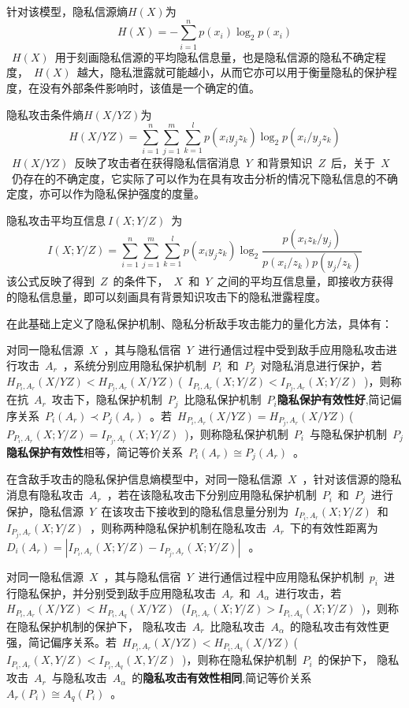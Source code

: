 \documentclass[pdftex,notypeinfo,twoside,openany,UTF8,fntef]{CASthesis}
\theoremstyle{THrm}{
	\newtheorem{question}{Question}[section]
	\newtheorem{property}{性质}[section]
	\newtheorem{assumption}{假设}[section]
	\newtheorem{claim}[lemma]{断言}
	
}
\begin{document}
针对该模型，隐私信源熵$H(X)$为
\begin{equation}
H(X)=-\sum_{i=1}^{n}p(x_{i})\log_{2}p(x_{i})
\end{equation}
~$H(X)$~用于刻画隐私信源的平均隐私信息量，也是隐私信源的隐私不确定程度，~$H(X)$~越大，隐私泄露就可能越小，从而它亦可以用于衡量隐私的保护程度，在没有外部条件影响时，该值是一个确定的值。

隐私攻击条件熵$H(X/YZ)$为
\begin{equation}
H(X/YZ)=\sum_{i=1}^{n}\sum_{j=1}^{m}\sum_{k=1}^{l}p(x_{i}y_{j}z_{k})\log_{2}p(x_{i}/y_{j}z_{k})
\end{equation}
~$H(X/YZ)$~反映了攻击者在获得隐私信宿消息~$Y$~和背景知识~$Z$~后，关于~$X$~仍存在的不确定度，它实际了可以作为在具有攻击分析的情况下隐私信息的不确定度，亦可以作为隐私保护强度的度量。

隐私攻击平均互信息$~I(X;Y/Z)$~为
\begin{equation}
I(X;Y/Z)=\sum_{i=1}^{n}\sum_{j=1}^{m}\sum_{k=1}^{l}p(x_{i}y_{j}z_{k})\log_{2}\frac{p(x_{i}z_{k}/y_{j})}{p(x_{i}/z_{k})p(y_{j}/z_{k})}
\end{equation}
该公式反映了得到~$Z$~的条件下，~$X$~和~$Y$~之间的平均互信息量，即接收方获得的隐私信息量，即可以刻画具有背景知识攻击下的隐私泄露程度。

在此基础上定义了隐私保护机制、隐私分析敌手攻击能力的量化方法，具体有：

对同一隐私信源~$X$~，其与隐私信宿~$Y$~进行通信过程中受到敌手应用隐私攻击进行攻击~$A_{r}$~，系统分别应用隐私保护机制~$P_{i}$~和~$P_{j}$~对隐私消息进行保护，若~$H_{P_{i},A_{r}}(X/YZ)<H_{P_{j},A_{r}}(X/YZ)~$(~$I_{P_{i},A_{r}}(X;Y/Z)<I_{P_{j},A_{r}}(X;Y/Z)$~)，则称在抗~$A_{r}$~攻击下，隐私保护机制~$P_{j}$~比隐私保护机制~$P_{i}$\textbf{隐私保护有效性好},简记偏序关系~$P_{i}(A_{r})\prec P_{j}(A_{r})$~。若~$H_{P_{i},A_{r}}(X/YZ)=H_{P_{j},A_{r}}(X/YZ)~$(~$P_{P_{i},A_{r}}(X;Y/Z)=I_{P_{j},A_{r}}(X;Y/Z)$~)，则称隐私保护机制~$P_{i}$~与隐私保护机制~$P_{j}$\textbf{隐私保护有效性}相等，简记等价关系~$P_{i}(A_{r})\cong P_{j}(A_{r})$~。


在含敌手攻击的隐私保护信息熵模型中，对同一隐私信源~$X$~，针对该信源的隐私消息有隐私攻击~$A_{r}$~，若在该隐私攻击下分别应用隐私保护机制~$P_{i}$~和~$P_{j}$~进行保护，隐私信源~$Y$~在该攻击下接收到的隐私信息量分别为~$I_{P_{i},A_{r}}(X;Y/Z)$~和~$I_{P_{j},A_{r}}(X;Y/Z)$~，则称两种隐私保护机制在隐私攻击~$A_{r}$~下的有效性距离为~$D_{i}(A_{r})=\left | I_{P_{i},A_{r}}(X;Y/Z)-I_{P_{j},A_{r}}(X;Y/Z) \right |~$~。

对同一隐私信源~$X$~，其与隐私信宿~$Y$~进行通信过程中应用隐私保护机制~$p_{i}$~进行隐私保护，并分别受到敌手应用隐私攻击~$A_{r}$~和~$A_{\alpha }$~进行攻击，若~${{H}_{{{P}_{i}},{{A}_{r}}}}(X/YZ)<{{H}_{{{P}_{i}},{{A}_{q}}}}(X/YZ)~$ (${{I}_{{{P}_{i}},{{A}_{r}}}}(X;Y/Z)>{{I}_{{{P}_{i}},{{A}_{q}}}}(X;Y/Z)$~)，则称在隐私保护机制的保护下， 隐私攻击~$A_{r}$~比隐私攻击~$A_{\alpha }$~的隐私攻击有效性更强，简记偏序关系。若~$H_{P_{i},A_{r}}(X/YZ)<H_{P_{i},A_{q}}(X/YZ)~$(~$I_{P_{i},A_{r}}(X,Y/Z)<I_{P_{i},A_{q}}(X,Y/Z)$~)，则称在隐私保护机制~$P_{i}$~的保护下， 隐私攻击~$A_{r}$~与隐私攻击~$A_{\alpha }$~的\textbf{隐私攻击有效性相同},简记等价关系~$A_{r}(P_{i})\cong A_{q}(P_{i})$~。
\end{document}
